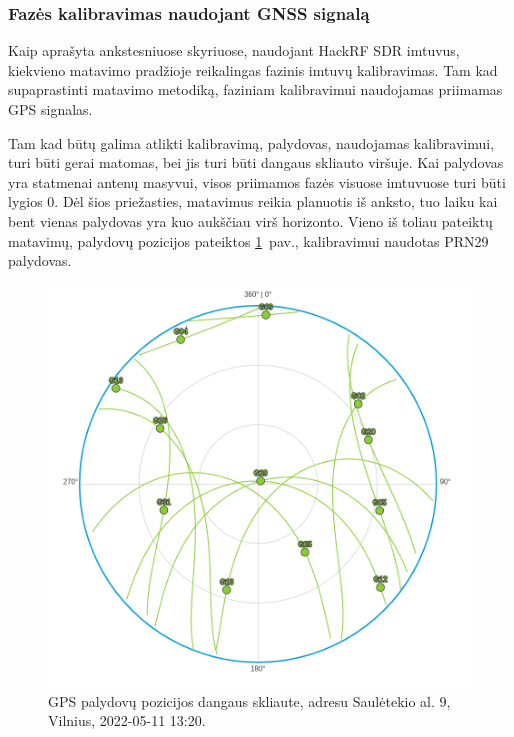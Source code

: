 \documentclass[main.tex]{subfiles}
\begin{document}
\subsubsection{Fazės kalibravimas naudojant GNSS signalą}

Kaip aprašyta ankstesniuose skyriuose, naudojant HackRF SDR imtuvus, kiekvieno
matavimo pradžioje reikalingas fazinis imtuvų kalibravimas. Tam kad supaprastinti
matavimo metodiką, faziniam kalibravimui naudojamas priimamas GPS signalas.

Tam kad būtų galima atlikti kalibravimą, palydovas, naudojamas kalibravimui,
turi būti gerai matomas, bei jis turi būti dangaus skliauto viršuje.
Kai palydovas yra statmenai antenų masyvui, visos priimamos fazės visuose
imtuvuose turi būti lygios 0. Dėl šios priežasties, matavimus reikia
planuotis iš anksto, tuo laiku kai bent vienas palydovas yra
kuo aukščiau virš horizonto. Vieno iš toliau pateiktų matavimų,
palydovų pozicijos pateiktos \ref{fig:gnss_sat_pos_calibartion}~pav.,
kalibravimui naudotas PRN29 palydovas.

\begin{figure}[ht]
    \begin{centering}
    \includegraphics[scale=1.2]{drawings/gnss_sattelites_position}
    \par\end{centering}
    \protect\caption{\label{fig:gnss_sat_pos_calibartion}GPS palydovų pozicijos dangaus skliaute, adresu Saulėtekio al. 9, Vilnius, 2022-05-11 13:20.}
\end{figure}
\end{document}
